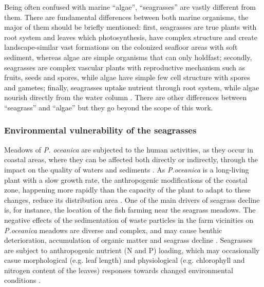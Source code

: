 \documentclass[10pt, a4paper]{article}
\begin{document}
Being often confused with marine “algae”, “seagrasses” are vastly different from them. There are
fundamental differences between both marine organisms, the major of them should be briefly
mentioned: first, seagrasses are true plants with root system and leaves which photosynthesis, have
complex structure and create landscape-similar vast formations on the colonized seafloor areas with
soft sediment, whereas algae are simple organisms that can only holdfast; secondly, seagrasses are
complex vascular plants with reproductive mechanism such as fruits, seeds and spores, while algae
have simple few cell structure with spores and gametes; finally, seagrasses uptake nutrient through
root system, while algae nourish directly from the water column \cite{Dixon05}\label{Dixon05}. There are other
differences between “seagrass” and “algae” but they go beyond the scope of this work.

\subsubsection{Environmental vulnerability of the seagrasses}
Meadows of \textit{P. oceanica} are subjected to the human activities, as they occur in coastal areas, where
they can be affected both directly \cite{Meinesz91}\label{Meinesz91} or indirectly, through the impact on the
quality of waters and sediments \cite{Duarte02}\label{Duarte02}. As \textit{P.oceanica} is a long-living plant with a slow
growth rate, the anthropogenic modifications of the coastal zone, happening more rapidly than the
capacity of the plant to adapt to these changes, reduce its distribution area \cite{Micheli05}\label{Micheli05}. One
of the main drivers of seagrass decline is, for instance, the location of the fish farming near the
seagrass meadows. The negative effects of the sedimentation of waste particles in the farm vicinities
on \textit{P.oceanica} meadows are diverse and complex, and may cause benthic deterioration, accumulation
of organic matter and seagrass decline \cite{Holmer08}\label{Holmer08}. Seagrasses are subject to anthropogenic
nutrient (N and P) loading, which may occasionally casue morphological (e.g. leaf length) and
physiological (e.g. chlorophyll and nitrogen content of the leaves) responses towards changed
environmental conditions \cite{Leoni06,Leoni07}\label{Leoni06} \label{Leoni07}. 
\end{document}
